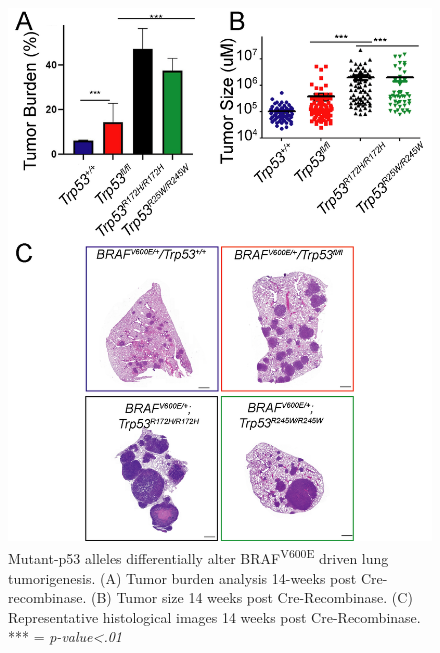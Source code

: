 \begin{figure}
\hypertarget{fig:04}{%
\centering
\includegraphics[width=1\textwidth,height=\textheight]{images/p53_2.png}
\caption{Mutant-p53 alleles differentially alter BRAF\textsuperscript{V600E} driven lung tumorigenesis. (A) Tumor burden analysis 14-weeks post Cre-recombinase. (B) Tumor size 14 weeks post Cre-Recombinase. (C) Representative histological images 14 weeks post Cre-Recombinase. *** = \emph{p-value\textless.01}}\label{fig:04}
}
\end{figure}

